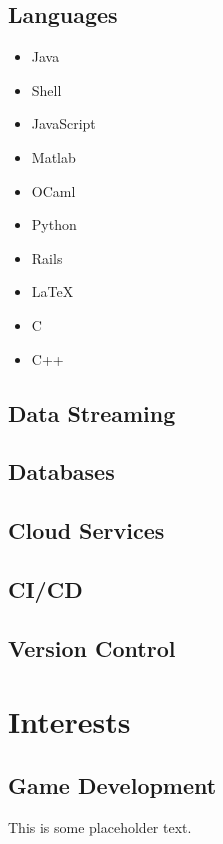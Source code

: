 \documentclass[letterpaper]{resume}
\begin{document}
\begin{minipage}[t]{0.33\textwidth}
\subsection{Languages}
\begin{itemize}
\item Java
\item Shell
\item JavaScript
\item Matlab
\item OCaml
\item Python
\item Rails
\item \LaTeX\
\item C
\item C++
\end{itemize}

\sectionspace %

\subsection{Data Streaming}

\subsection{Databases}

\subsection{Cloud Services}

\subsection{CI/CD}

\subsection{Version Control}

\sectionspace %


\section{Interests}

\subsection{Game Development}
This is some placeholder text.

\sectionspace %


\end{minipage} %
\end{document}
